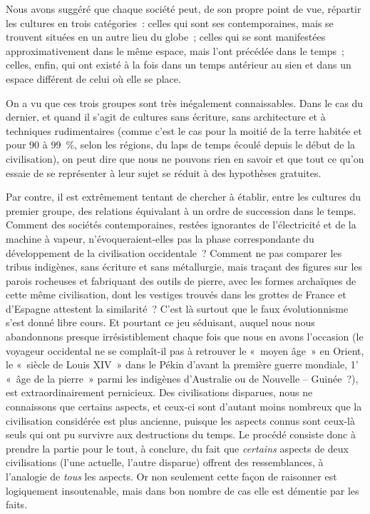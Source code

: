 \documentclass[french,twoside]{book} %
\begin{document}
\noindent Nous avons suggéré que chaque société peut, de son propre point de vue, répartir les cultures en trois catégories : celles qui sont ses contemporaines, mais se trouvent situées en un autre lieu du globe ; celles qui se sont manifestées approximativement dans le même espace, mais l’ont précédée dans le temps ; celles, enfin, qui ont existé à la fois dans un temps antérieur au sien et dans un espace différent de celui où elle se place.\par
On a vu que ces trois groupes sont très inégalement connaissables. Dans le cas du dernier, et quand il s’agit de cultures sans écriture, sans architecture et à techniques rudimentaires (comme c’est le cas pour la moitié de la terre habitée et pour 90 à 99 \%, selon les régions, du laps de temps écoulé depuis le début de la civilisation), on peut dire que nous ne pouvons rien en savoir et que tout ce qu’on essaie de se représenter à leur sujet se réduit à des hypothèses gratuites.\par
Par contre, il est extrêmement tentant de chercher à établir, entre les cultures du premier groupe, des relations équivalant à un ordre de succession dans le temps. Comment des sociétés contemporaines, restées ignorantes de l’électricité et de la machine à vapeur, n’évoqueraient-elles pas la phase correspondante du développement de la civilisation occidentale ? Comment ne pas comparer les tribus indigènes, sans écriture et sans métallurgie, mais traçant des figures sur les parois rocheuses et fabriquant des outils de pierre, avec les formes archaïques de cette même civilisation, dont les vestiges trouvés dans les grottes de France et d’Espagne attestent la similarité ? C’est là surtout que le faux évolutionnisme s’est donné libre cours. Et pourtant ce jeu séduisant, auquel nous nous abandonnons presque irrésistiblement chaque fois que nous en avons l’occasion (le voyageur occidental ne se complaît-il pas à retrouver le « moyen âge » en Orient, le « siècle de Louis XIV » dans le Pékin d’avant la première guerre mondiale, 1’ « âge de la pierre » parmi les indigènes d’Australie ou de Nouvelle – Guinée ?), est extraordinairement pernicieux. Des civilisations disparues, nous ne connaissons que certains aspects, et ceux-ci sont d’autant moins nombreux que la civilisation considérée est plus ancienne, puisque les aspects connus sont ceux-là seuls qui ont pu survivre aux destructions du temps. Le procédé consiste donc à prendre la partie pour le tout, à conclure, du fait que \emph{certains} aspects de deux civilisations (l’une actuelle, l’autre disparue) offrent des ressemblances, à l’analogie de \emph{tous} les aspects. Or non seulement cette façon de raisonner est logiquement insoutenable, mais dans bon nombre de cas elle est démentie par les faits.\par
\end{document}
